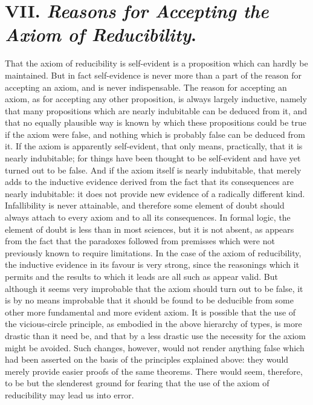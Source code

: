 \documentclass[letterpaper,12pt,openany,leqno]{book}
\begin{document}
\section*{\centering VII. \textit{Reasons for Accepting the Axiom of Reducibility}.}

That the axiom of reducibility is self-evident is a proposition which can hardly be maintained. But in fact self-evidence is never more than a part of the reason for accepting an axiom, and is never indispensable. The reason for accepting an axiom, as for accepting any other proposition, is always largely inductive, namely that many propositions which are nearly indubitable can be deduced from it, and that no equally plausible way is known by which these propositions could be true if the axiom were false, and nothing which is probably false can be deduced from it. If the axiom is apparently self-evident, that only means, practically, that it is nearly indubitable; for things have been thought to be self-evident and have yet turned out to be false. And if the axiom itself is nearly indubitable, that merely adds to the inductive evidence derived from the fact that its consequences are nearly indubitable: it does not provide new evidence of a radically different kind. Infallibility is never attainable, and therefore some element of doubt should always attach to every axiom and to all its consequences. In formal logic, the element of doubt is less than in most sciences, but it is not absent, as appears from the fact that the paradoxes followed from premisses which were not previously known to require limitations. In the case of the axiom of reducibility, the inductive evidence in its favour is very strong, since the reasonings which it permits and the results to which it leads are all such as appear valid. But although it seems very improbable that the axiom should turn out to be false, it is by no means improbable that it should be found to be deducible from some other more fundamental and more evident axiom. It is possible that the use of the vicious-circle principle, as embodied in the above hierarchy of types, is more drastic than it need be, and that by a less drastic use the necessity for the axiom might be avoided. Such changes, however, would not render anything false which had been asserted on the basis of the principles explained above: they would merely provide easier proofs of the same theorems. There would seem, therefore, to be but the slenderest ground for fearing that the use of the axiom of reducibility may lead us into error.
\end{document}
